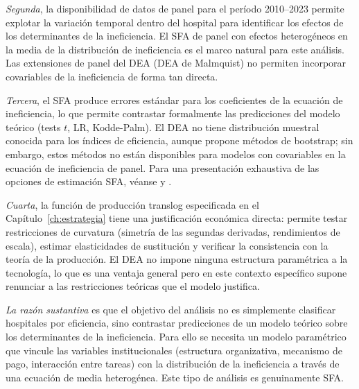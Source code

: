 \textit{Segunda}, la disponibilidad de datos de panel para el período 2010--2023 permite explotar la variación temporal dentro del hospital para identificar los efectos de los determinantes de la ineficiencia. El SFA de panel con efectos heterogéneos en la media de la distribución de ineficiencia \citep{battese1995,wang2002} es el marco natural para este análisis. Las extensiones de panel del DEA (DEA de Malmquist) no permiten incorporar covariables de la ineficiencia de forma tan directa.

\textit{Tercera}, el SFA produce errores estándar para los coeficientes de la ecuación de ineficiencia, lo que permite contrastar formalmente las predicciones del modelo teórico (tests $t$, LR, Kodde-Palm). El DEA no tiene distribución muestral conocida para los índices de eficiencia, aunque \citet{simar2007} propone métodos de bootstrap; sin embargo, estos métodos no están disponibles para modelos con covariables en la ecuación de ineficiencia de panel. Para una presentación exhaustiva de las opciones de estimación SFA, véanse \citet{kumbhakar2000} y \citet{greene2008}.

\textit{Cuarta}, la función de producción translog especificada en el Capítulo~\ref{ch:estrategia} tiene una justificación económica directa: permite testar restricciones de curvatura (simetría de las segundas derivadas, rendimientos de escala), estimar elasticidades de sustitución y verificar la consistencia con la teoría de la producción. El DEA no impone ninguna estructura paramétrica a la tecnología, lo que es una ventaja general pero en este contexto específico supone renunciar a las restricciones teóricas que el modelo justifica.

\textit{La razón sustantiva} es que el objetivo del análisis no es simplemente clasificar hospitales por eficiencia, sino contrastar predicciones de un modelo teórico sobre los determinantes de la ineficiencia. Para ello se necesita un modelo paramétrico que vincule las variables institucionales (estructura organizativa, mecanismo de pago, interacción entre tareas) con la distribución de la ineficiencia a través de una ecuación de media heterogénea. Este tipo de análisis es genuinamente SFA.


